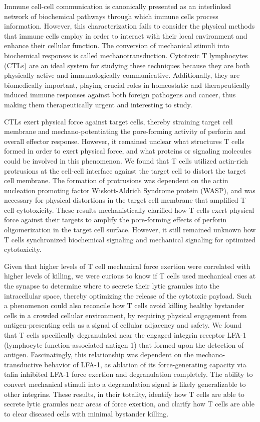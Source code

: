 Immune cell-cell communication is canonically presented as an interlinked network of biochemical pathways through which immune cells process information. However, this characterization fails to consider the physical methods that immune cells employ in order to interact with their local environment and enhance their cellular function. The conversion of mechanical stimuli into biochemical responses is called mechanotransduction. Cytotoxic T lymphocytes (CTLs) are an ideal system for studying these techniques because they are both physically active and immunologically communicative. Additionally, they are biomedically important, playing crucial roles in homeostatic and therapeutically induced immune responses against both foreign pathogens and cancer, thus making them therapeutically urgent and interesting to study.

CTLs exert physical force against target cells, thereby straining target cell membrane and mechano-potentiating the pore-forming activity of perforin and overall effector response. However, it remained unclear what structures T cells formed in order to exert physical force, and what proteins or signaling molecules could be involved in this phenomenon. We found that T cells utilized actin-rich protrusions at the cell-cell interface against the target cell to distort the target cell membrane. The formation of protrusions was dependent on the actin nucleation promoting factor Wiskott-Aldrich Syndrome protein (WASP), and was necessary for physical distortions in the target cell membrane that amplified T cell cytotoxicity. These results mechanistically clarified how T cells exert physical force against their targets to amplify the pore-forming effects of perforin oligomerization in the target cell surface. However, it still remained unknown how T cells synchronized biochemical signaling and mechanical signaling for optimized cytotoxicity.

Given that higher levels of T cell mechanical force exertion were correlated with higher levels of killing, we were curious to know if T cells used mechanical cues at the synapse to determine where to secrete their lytic granules into the intracellular space, thereby optimizing the release of the cytotoxic payload. Such a phenomenon could also reconcile how T cells avoid killing healthy bystander cells in a crowded cellular environment, by requiring physical engagement from antigen-presenting cells as a signal of cellular adjacency and safety. We found that T cells specifically degranulated near the engaged integrin receptor LFA-1 (lymphocyte function-associated antigen 1) that formed upon the detection of antigen. Fascinatingly, this relationship was dependent on the mechano-transductive behavior of LFA-1, as ablation of its force-generating capacity via talin inhibited LFA-1 force exertion and degranulation completely. The ability to convert mechanical stimuli into a degranulation signal is likely generalizable to other integrins. These results, in their totality, identify how T cells are able to secrete lytic granules near areas of force exertion, and clarify how T cells are able to clear diseased cells with minimal bystander killing.

